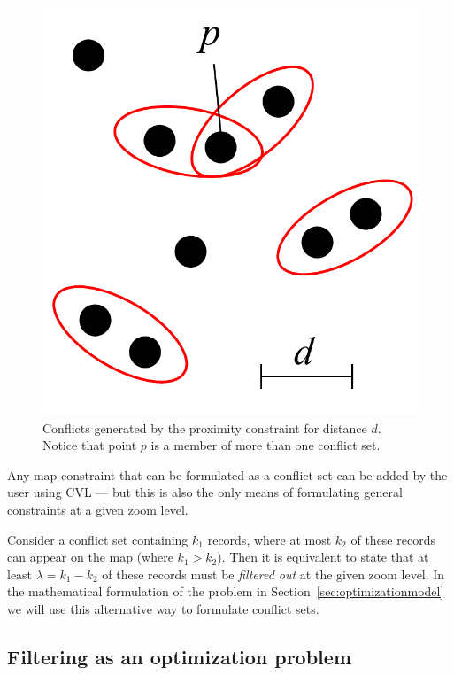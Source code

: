 \begin{figure}[htbp]
\begin{center}
\includegraphics[scale=.3]{figs/cvl_proximity_conflicts.pdf}
\caption{Conflicts generated by the proximity constraint for distance $d$. Notice that point $p$ is a member of more than one conflict set.}
\label{fig:proximity:conflict}
\end{center}
\end{figure}

Any map constraint that can be formulated as a conflict set can be added by the user using CVL --- but this is also the only means of formulating general constraints at a given zoom level. 

Consider a conflict set containing $k_1$ records, where at most $k_2$ of these records can appear on the map (where $k_1 > k_2$). Then it is equivalent to state that at least $\lambda = k_1 - k_2$ of these records must be \emph{filtered out} at the given zoom level. In the mathematical formulation of the problem in Section~\ref{sec:optimizationmodel} we will use this alternative way to formulate conflict sets.

\subsection{Filtering as an optimization problem}
\label{sec:filtering}

